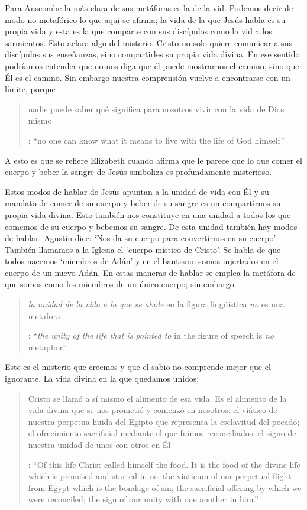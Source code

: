 Para Anscombe la más clara de sus metáforas es la de la vid. Podemos decir de modo no metafórico lo que aquí se afirma; la vida de la que Jesús habla es su propia vida y esta es la que comparte con sus discípulos como la vid a los sarmientos. Esto aclara algo del misterio. Cristo no solo quiere comunicar a sus discípulos sus enseñanzas, sino compartirles su propia vida divina. En ese sentido podríamos entender que no nos diga que él puede mostrarnos el camino, sino que Él es el camino. Sin embargo nuestra comprensión vuelve a encontrarse con un límite, porque \blockquote[{\cite[110]{anscombe1981erp:ot}}: \enquote{no one can know what it means to live with the life of God himself}]{nadie puede saber qué significa para nosotros vivir con la vida de Dios mismo}. A esto es que se refiere Elizabeth cuando afirma que le parece que lo que comer el cuerpo y beber la sangre de Jesús simboliza es profundamente misterioso.

Estos modos de hablar de Jesús apuntan a la unidad de vida con Él y su mandato de comer de su cuerpo y beber de su sangre es un compartirnos su propia vida divina. Esto también nos constituye en una unidad a todos los que comemos de su cuerpo y bebemos su sangre. De esta unidad también hay modos de hablar. Agustín dice: \enquote*{Nos da su cuerpo para convertirnos en su cuerpo}. También llamamos a la Iglesia el \enquote*{cuerpo místico de Cristo}. Se habla de que todos nacemos \enquote*{miembros de Adán} y en el bautismo somos injertados en el cuerpo de un nuevo Adán. En estas maneras de hablar se emplea la metáfora de que somos como los miembros de un único cuerpo; sin embargo \blockquote[{\cite[112]{anscombe1981erp:ot}}: \enquote{\emph{the unity of the life that is pointed to} in the figure of speech is \emph{no} metaphor}]{\emph{la unidad de la vida a la que se alude} en la figura lingüística \emph{no} es una metafora}.

Este es el misterio que creemos y que el sabio no comprende mejor que el ignorante. La vida divina en la que quedamos unidos; \blockquote[{\cite[112]{anscombe1981erp:ot}}: \enquote{Of this life Christ called himself the food. It is the food of the divine life which is promised and started in us: the viaticum of our perpetual flight from Egypt which is the bondage of sin; the sacrificial offering by which we were reconciled; the sign of our unity with one another in him.}]{Cristo se llamó a sí mismo el alimento de esa vida. Es el alimento de la vida divina que se nos prometió y comenzó en nosotros: el viático de nuestra perpetua huida del Egipto que representa la esclavitud del pecado; el ofrecimiento sacrificial mediante el que fuimos reconciliados; el signo de nuestra unidad de unos con otros en Él}.
